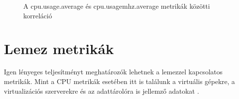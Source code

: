 \documentclass[a4paper,10pt,titlepage]{article}
\begin{document}
\begin{figure}[h!]
  \centering
  \caption{A cpu.usage.average és cpu.usagemhz.average metrikák közötti korreláció}
  \label{fig:corrgram-hosts}
\end{figure}

\clearpage

\section{Lemez metrikák}

Igen lényeges teljesítményt meghatározók lehetnek a lemezzel kapcsolatos metrikák. Mint a CPU metrikák esetében itt is találunk a virtuális gépekre, a virtualizációs szerverekre és az adattárolóra is jellemző adatokat \cite{link:DC}.

\end{document}
